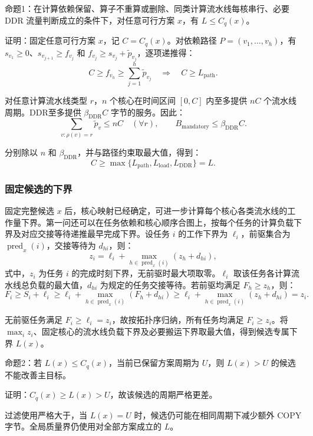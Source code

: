 命题1：在计算依赖保留、算子不重算或删除、同类计算流水线每核串行、必要 DDR 流量判断成立的条件下，对任意可行方案 $x$，有 $L\le C_q(x)$。

证明：固定任意可行方案 $x$，记 $C=C_q(x)$。对依赖路径 $P=(v_1,\ldots,v_h)$，有 $s_{v_1}\ge0$、$s_{v_{j+1}}\ge f_{v_j}$ 和 $f_{v_j}\ge s_{v_j}+\widetilde p_{v_j}$，逐项递推得：
\[
 C\ge f_{v_h}\ge\sum_{j=1}^{h}\widetilde p_{v_j}
 \quad\Longrightarrow\quad C\ge L_{\mathrm{path}}.
\]

对任意计算流水线类型 $r$，$n$ 个核心在时间区间 $[0,C]$ 内至多提供 $nC$ 个流水线周期。DDR至多提供 $\beta_{\mathrm{DDR}}C$ 字节的服务。因此：
\[
 \sum_{v:\rho(v)=r}\widetilde p_v\le nC\quad(\forall r),\qquad
 B_{\mathrm{mandatory}}\le\beta_{\mathrm{DDR}}C.
\]

分别除以 $n$ 和 $\beta_{\mathrm{DDR}}$，并与路径约束取最大值，得到：
\[
 C\ge\max\{L_{\mathrm{path}},L_{\mathrm{load}},L_{\mathrm{DDR}}\}=L.
\]


\subsubsection{固定候选的下界}
固定完整候选 $x$ 后，核心映射已经确定，可进一步计算每个核心各类流水线的工作量下界。第一问还可以在任务依赖和核心顺序合图上，按每个任务的计算负载下界及对应交接等待递推最早完成下界。设任务 $i$ 的工作下界为 $\ell_i$，前驱集合为 $\operatorname{pred}_x(i)$，交接等待为 $d_{hi}$，则：
\begin{equation}
 z_i=\ell_i+\max_{h\in\operatorname{pred}_x(i)}(z_h+d_{hi}),
 \label{eq:taskbound}
\end{equation}
\noindent 式中，$z_i$ 为任务 $i$ 的完成时刻下界，无前驱时最大项取零。$\ell_i$ 取该任务各计算流水线总负载的最大值，$d_{hi}$ 为规定的任务交接等待。若前驱均满足 $F_h\ge z_h$，则：
\[
 F_i\ge S_i+\ell_i
 \ge\ell_i+\max_{h\in\operatorname{pred}_x(i)}(F_h+d_{hi})
 \ge\ell_i+\max_{h\in\operatorname{pred}_x(i)}(z_h+d_{hi})=z_i.
\]

无前驱任务满足 $F_i\ge\ell_i=z_i$，故按拓扑序归纳，所有任务均满足 $F_i\ge z_i$。将 $\max_i z_i$、固定核心的流水线负载下界及必要搬运下界取最大值，得到候选专属下界 $L(x)$。

命题2：若 $L(x)\le C_q(x)$，当前已保留方案周期为 $U$，则 $L(x)>U$ 的候选不能改善主目标。

证明：$C_q(x)\ge L(x)>U$，故该候选的周期严格更差。

过滤使用严格大于，当 $L(x)=U$ 时，候选仍可能在相同周期下减少额外 COPY 字节。全局质量界仍使用对全部方案成立的 $L$。

